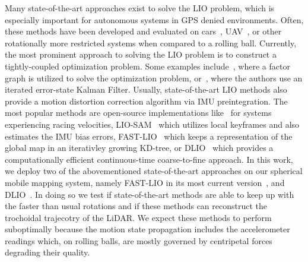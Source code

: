 Many state-of-the-art approaches exist to solve the LIO problem, which is especially important for autonomous systems in GPS denied environments.
Often, these methods have been developed and evaluated on cars~\cite{8967880}, UAV~\cite{s21123955}, or other rotationally more restricted systems when compared to a rolling ball. 
Currently, the most prominent approach to solving the LIO problem is to construct a tightly-coupled optimization problem.
Some examples include~\cite{9760190}, where a factor graph is utilized to solve the optimization problem, or~\cite{9197567}, where the authors use an iterated error-state Kalman Filter.
Usually, state-of-the-art LIO methods also provide a motion distortion correction algorithm via IMU preintegration.
The most popular methods are open-source implementations like~\cite{huguet2022limo} for systems experiencing racing velocities, LIO-SAM~\cite{9341176} which utilizes local keyframes and also estimates the IMU bias errors, FAST-LIO~\cite{xu2022fast} which keeps a representation of the global map in an iterativley growing KD-tree, or DLIO~\cite{10160508} which provides a computationally efficient continuous-time coarse-to-fine approach.
In this work, we deploy two of the abovementioned state-of-the-art approaches on our spherical mobile mapping system, namely FAST-LIO in its most current version~\cite{xu2022fast}, and DLIO~\cite{10160508}.
In doing so we test if state-of-the-art methods are able to keep up with the faster than usual rotations and if these methods can reconstruct the trochoidal trajecotry of the LiDAR.
We expect these methods to perform suboptimally because the motion state propagation includes the accelerometer readings which, on rolling balls, are mostly governed by centripetal forces degrading their quality.     